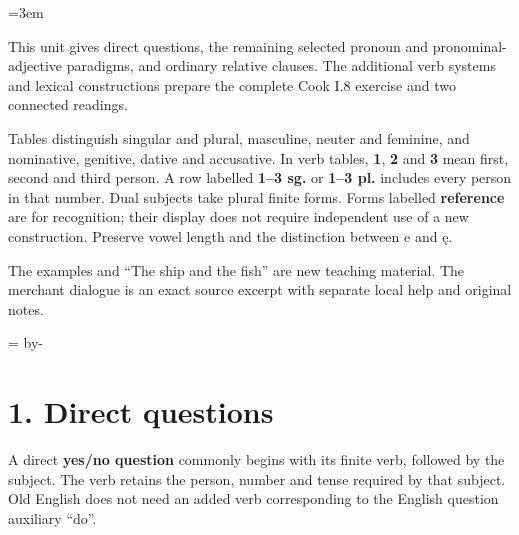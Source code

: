 \newcommand{\runningtitle}{Unit 8. Questions and relatives}

\emergencystretch=3em
\newcommand{\itempara}[2]{\par\addvspace{3pt}\noindent\hangindent=1.8em\hangafter=1\makebox[1.8em][l]{#1.}#2\par}
\newcommand{\reserve}[1]{\par\penalty-100\begingroup\dimen0=\pagegoal\advance\dimen0 by-\pagetotal\ifdim\dimen0<#1\newpage\fi\endgroup}

\raggedright
{}

This unit gives direct questions, the remaining selected pronoun and pronominal-adjective paradigms, and ordinary relative clauses. The additional verb systems and lexical constructions prepare the complete Cook I.8 exercise and two connected readings.

Tables distinguish singular and plural, masculine, neuter and feminine, and nominative, genitive, dative and accusative. In verb tables, \textbf{1}, \textbf{2} and \textbf{3} mean first, second and third person. A row labelled \textbf{1–3 sg.} or \textbf{1–3 pl.} includes every person in that number. Dual subjects take plural finite forms. Forms labelled \textbf{reference} are for recognition; their display does not require independent use of a new construction. Preserve vowel length and the distinction between e and ę.

The examples and “The ship and the fish” are new teaching material. The merchant dialogue is an exact source excerpt with separate local help and original notes.

\reserve{7\baselineskip}
\section*{1. Direct questions}

A direct \textbf{yes/\allowbreak{}no question} commonly begins with its finite verb, followed by the subject. The verb retains the person, number and tense required by that subject. Old English does not need an added verb corresponding to the English question auxiliary “do”.

